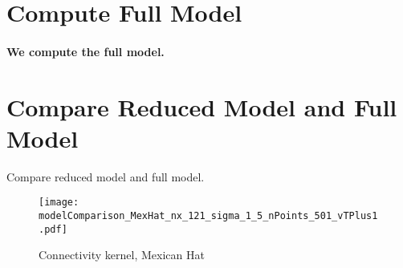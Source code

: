 \documentclass[a4paper, 12pt, english]{article}
\begin{document}
\newpage





\section{Compute Full Model}
\paragraph{We compute the full model.}

\newpage


\section{Compare Reduced Model and Full Model}
Compare reduced model and full model.
\begin{figure}
\centering
\texttt{[image: modelComparison\_MexHat\_nx\_121\_sigma\_1\_5\_nPoints\_501\_vTPlus1.pdf]}
\caption{Connectivity kernel, Mexican Hat}
\end{figure}
\end{document}
